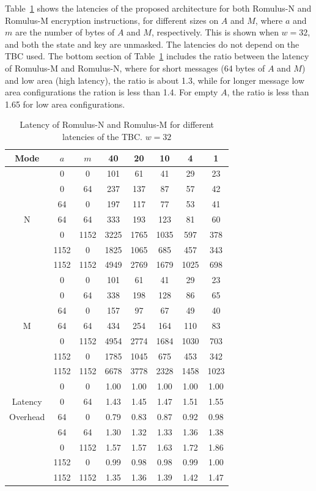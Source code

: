 \documentclass[conference]{IEEEtran}
\begin{document}
Table~\ref{tab:instlatency} shows the latencies of the proposed architecture for both Romulus-N and Romulus-M encryption instructions, for different sizes on $A$ and $M$, where $a$ and $m$ are the number of bytes of $A$ and $M$, respectively. This is shown when $w=32$, and both the state and key are unmasked. The latencies do not depend on the TBC used. The bottom section of Table~\ref{tab:instlatency} includes the ratio between the latency of Romulus-M and Romulus-N, where for short messages (64 bytes of $A$ and $M$) and low area (high latency), the ratio is about 1.3, while for longer message low area configurations the ration is less than 1.4. For empty $A$, the ratio is less than 1.65 for low area configurations.

\begin{table}[!thb]
  \centering
  \caption{Latency of Romulus-N and Romulus-M for different latencies of the TBC. $w=32$}\label{tab:instlatency}
  \begin{tabular}{c|c|c|c|c|c|c|c}\hline
  \textbf{Mode} & \textbf{$a$} & \textbf{$m$} & 40 & 20 & 10 & 4 & 1 \\\hline \hline
  \multirow{7}{*}{N} & 0 & 0 & 101 & 61 & 41 & 29 & 23 \\
  &  0 & 64 & 237 & 137 & 87 & 57 & 42 \\
  & 64 &  0 & 197 & 117 & 77 & 53 & 41 \\ 
  & 64 & 64 & 333 & 193 & 123 & 81 & 60 \\
  & 0 & 1152 & 3225	& 1765	& 1035	& 597	& 378 \\
  & 1152 & 0 & 1825	& 1065 &	685	& 457	& 343 \\
  & 1152 & 1152 & 4949 & 2769 & 1679	& 1025 & 698 \\ \hline

  \multirow{7}{*}{M} & 0 & 0 & 101	& 61	& 41	& 29	& 23 \\
  &  0 & 64 & 338	&198	&128	&86	&65 \\
  & 64 &  0 & 157	& 97	&67	&49	&40  \\ 
  & 64 & 64 & 434	&254	&164	&110	&83 \\
  & 0 & 1152 & 4954	&2774	&1684	&1030	&703 \\
  & 1152 & 0 & 1785	&1045	&675	&453	&342 \\
  & 1152 & 1152 & 6678	&3778	&2328	&1458	&1023 \\ \hline

  & 0 & 0 & 1.00	& 1.00	& 1.00	& 1.00	& 1.00 \\
  Latency& 0& 64& 1.43	& 1.45	& 1.47	& 1.51	& 1.55 \\
  Overhead& 64& 0& 0.79	& 0.83	& 0.87	& 0.92	& 0.98 \\
  & 64& 64& 1.30	& 1.32	& 1.33	& 1.36	& 1.38 \\
  & 0& 1152& 1.57	& 1.57	& 1.63  & 1.72	& 1.86 \\
  & 1152& 0& 0.99	& 0.98	& 0.98	& 0.99	& 1.00 \\
  & 1152& 1152& 1.35	& 1.36	& 1.39	& 1.42	& 1.47 \\ \hline
  \end{tabular}
\end{table}
\end{document}
